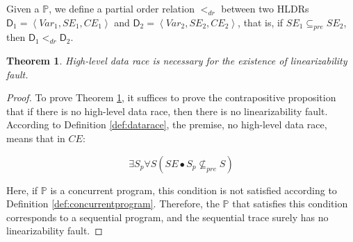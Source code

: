 \documentclass[runningheads]{llncs}
\newtheorem{myTheo}{Theorem}
\begin{document}
 Given a $\mathbb{P}$, we define a partial order relation $<_{dr}$ between two HLDRs $\mathsf{D}_1=\left\langle \mathit{Var}_1, \mathit{SE}_1, \mathit{CE}_1\right\rangle$ and $\mathsf{D}_2 = \left\langle \mathit{Var}_2, \mathit{SE}_2, \mathit{CE}_2\right\rangle$, that is, if $\mathit{SE}_1\subseteq_{pre}\mathit{SE}_2$, then $\mathsf{D}_1<_{dr}\mathsf{D}_2$. 



\vspace{-0.3cm}
\begin{myTheo}\label{theo:datarace}
    \textit{High-level data race} is necessary for the existence of \textit{linearizability fault}.
\end{myTheo}
\vspace{-0.3cm}
\vspace{-0.3cm}
\begin{proof}
To prove Theorem \ref{theo:datarace}, it suffices to prove the contrapositive proposition that if there is no high-level data race, 
then there is no linearizability fault. According to Definition \ref{def:datarace}, the premise, no high-level data race, means that in $\mathit{CE}$:

$$\exists S_p \forall S ( \mathit{SE}\bullet S_p \nsubseteq_{pre} S)$$

Here, if $\mathbb{P}$ is a concurrent program, this condition is not satisfied according to Definition \ref{def:concurrentprogram}. 
Therefore, the $\mathbb{P}$ that satisfies this condition corresponds to a sequential program, and the sequential trace surely has no linearizability fault.
\end{proof}
\end{document}
